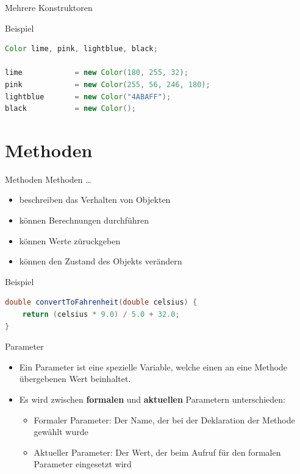 \documentclass[18pt]{beamer}
\begin{document}
\begin{frame}[fragile]{Mehrere Konstruktoren}
    \begin{exampleblock}{Beispiel}
        \begin{lstlisting}[language=Java]
Color lime, pink, lightblue, black;

lime            = new Color(180, 255, 32);
pink            = new Color(255, 56, 246, 180);
lightblue       = new Color("4ABAFF");
black           = new Color();

        \end{lstlisting}

    \end{exampleblock}
\end{frame}


\section{Methoden}

\begin{frame}[fragile]{Methoden}
    Methoden \dots
    \begin{itemize}
        \item beschreiben das Verhalten von Objekten
        \item können Berechnungen durchführen
        \item können Werte züruckgeben
        \item können den Zustand des Objekts verändern
    \end{itemize}

    \begin{exampleblock}{Beispiel}
        \begin{lstlisting}[language=Java]
double convertToFahrenheit(double celsius) {
    return (celsius * 9.0) / 5.0 + 32.0;
}
        \end{lstlisting}
    \end{exampleblock}


\end{frame}

\begin{frame}{Parameter}
    \begin{itemize}
        \item Ein Parameter ist eine spezielle Variable, welche einen an eine Methode übergebenen Wert beinhaltet.
        \pause
        \item Es wird zwischen \textbf{formalen} und \textbf{aktuellen} Parametern unterschieden:
        \begin{itemize}
            \item Formaler Parameter: Der Name, der bei der Deklaration der Methode gewählt wurde
            \item Aktueller Parameter: Der Wert, der beim Aufruf für den formalen Parameter eingesetzt wird
        \end{itemize}
    \end{itemize}

\end{frame}
\end{document}
